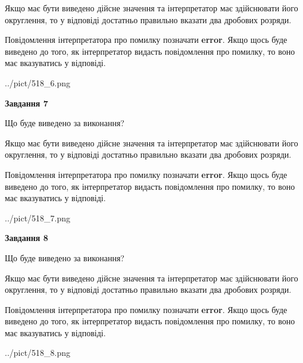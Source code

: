 \documentclass[12pt, ukrainian]{article}
\begin{document}
{\begin {Large}
Якщо має бути виведено дійсне значення та інтерпретатор має здійснювати його округлення, 
то у відповіді достатньо правильно вказати два дробових розряди.

Повідомлення інтерпретатора про помилку позначати \textbf{error}.
Якщо щось буде виведено до того, як інтерпретатор видасть повідомлення про помилку, 
то воно має вказуватись у відповіді. \par

\begin{center}
	{../pict/518_6.png}
\end{center}
\newpage

{\begin {center}\textbf{Завдання 7}\end {center}}\par
Що буде виведено за виконання? \par

Якщо має бути виведено дійсне значення та інтерпретатор має здійснювати його округлення, 
то у відповіді достатньо правильно вказати два дробових розряди.

Повідомлення інтерпретатора про помилку позначати \textbf{error}.
Якщо щось буде виведено до того, як інтерпретатор видасть повідомлення про помилку, 
то воно має вказуватись у відповіді. \par

\begin{center}
	{../pict/518_7.png}
\end{center}
\newpage

{\begin {center}\textbf{Завдання 8}\end {center}}\par
Що буде виведено за виконання? \par

Якщо має бути виведено дійсне значення та інтерпретатор має здійснювати його округлення, 
то у відповіді достатньо правильно вказати два дробових розряди.

Повідомлення інтерпретатора про помилку позначати \textbf{error}.
Якщо щось буде виведено до того, як інтерпретатор видасть повідомлення про помилку, 
то воно має вказуватись у відповіді. \par

\begin{center}
	{../pict/518_8.png}
\end{center}
\newpage


\end{Large}}
\end{document}
